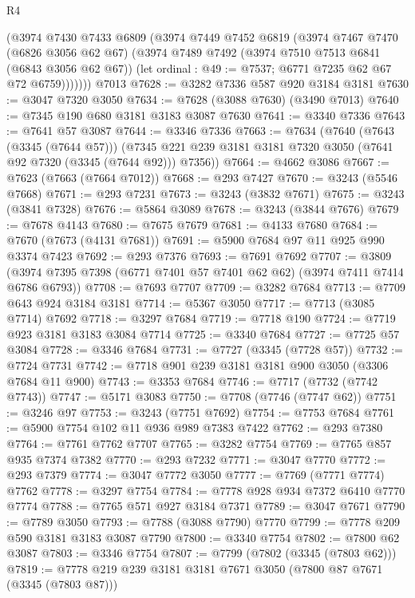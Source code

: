 \begin{lexlean}{R4}
\begin{coremodule}
        (@3974
          @7430
          @7433
          @6809
          (@3974
            @7449
            @7452
            @6819
            (@3974
              @7467
              @7470
              (@6826 @3056 @62 @67)
              (@3974
                @7489
                @7492
                (@3974 @7510 @7513 @6841 (@6843 @3056 @62 @67))
                (let ordinal : @49 := @7537; @6771 @7235 @62 @67 @72 @6759)))))))
    @7013
@7628 := @3282 @7336 @587 @920 @3184 @3181
@7630 := @3047 @7320 @3050
@7634 := @7628 (@3088 @7630) (@3490 @7013)
@7640 := @7345 @190 @680 @3181 @3183 @3087 @7630
@7641 := @3340 @7336
@7643 := @7641 @57 @3087
@7644 := @3346 @7336
@7663 := @7634
    (@7640
      (@7643 (@3345 (@7644 @57)))
      (@7345 @221 @239 @3181 @3181 @7320 @3050 (@7641 @92 @7320 (@3345 (@7644 @92))) @7356))
@7664 := @4662 @3086
@7667 := @7623 (@7663 (@7664 @7012))
@7668 := @293 @7427
@7670 := @3243 (@5546 @7668)
@7671 := @293 @7231
@7673 := @3243 (@3832 @7671)
@7675 := @3243 (@3841 @7328)
@7676 := @5864 @3089
@7678 := @3243 (@3844 @7676)
@7679 := @7678 @4143
@7680 := @7675 @7679
@7681 := @4133 @7680
@7684 := @7670 (@7673 (@4131 @7681))
@7691 := @5900 @7684 @97 @11 @925 @990 @3374 @7423
@7692 := @293 @7376
@7693 := @7691 @7692
@7707 := @3809 (@3974 @7395 @7398 (@6771 @7401 @57 @7401 @62 @62) (@3974 @7411 @7414 @6786 @6793))
@7708 := @7693 @7707
@7709 := @3282 @7684
@7713 := @7709 @643 @924 @3184 @3181
@7714 := @5367 @3050
@7717 := @7713 (@3085 @7714) @7692
@7718 := @3297 @7684
@7719 := @7718 @190
@7724 := @7719 @923 @3181 @3183 @3084 @7714
@7725 := @3340 @7684
@7727 := @7725 @57 @3084
@7728 := @3346 @7684
@7731 := @7727 (@3345 (@7728 @57))
@7732 := @7724 @7731
@7742 := @7718 @901 @239 @3181 @3181 @900 @3050 (@3306 @7684 @11 @900)
@7743 := @3353 @7684
@7746 := @7717 (@7732 (@7742 @7743))
@7747 := @5171 @3083
@7750 := @7708 (@7746 (@7747 @62))
@7751 := @3246 @97
@7753 := @3243 (@7751 @7692)
@7754 := @7753 @7684
@7761 := @5900 @7754 @102 @11 @936 @989 @7383 @7422
@7762 := @293 @7380
@7764 := @7761 @7762 @7707
@7765 := @3282 @7754
@7769 := @7765 @857 @935 @7374 @7382
@7770 := @293 @7232
@7771 := @3047 @7770
@7772 := @293 @7379
@7774 := @3047 @7772 @3050
@7777 := @7769 (@7771 @7774) @7762
@7778 := @3297 @7754
@7784 := @7778 @928 @934 @7372 @6410 @7770 @7774
@7788 := @7765 @571 @927 @3184 @7371
@7789 := @3047 @7671
@7790 := @7789 @3050
@7793 := @7788 (@3088 @7790) @7770
@7799 := @7778 @209 @590 @3181 @3183 @3087 @7790
@7800 := @3340 @7754
@7802 := @7800 @62 @3087
@7803 := @3346 @7754
@7807 := @7799 (@7802 (@3345 (@7803 @62)))
@7819 := @7778 @219 @239 @3181 @3181 @7671 @3050 (@7800 @87 @7671 (@3345 (@7803 @87)))

\end{coremodule}
\end{lexlean}
